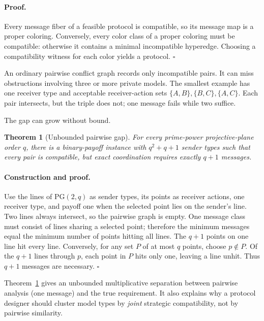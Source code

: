 \documentclass[letterpaper]{article} %
\newtheorem{theorem}{Theorem}
\begin{document}
\paragraph{Proof.}
Every message fiber of a feasible protocol is compatible, so its message map is
a proper coloring. Conversely, every color class of a proper coloring must be
compatible: otherwise it contains a minimal incompatible hyperedge. Choosing a
compatibility witness for each color yields a protocol. \hfill$\square$

An ordinary pairwise conflict graph records only incompatible pairs. It can
miss obstructions involving three or more private models. The smallest example
has one receiver type and acceptable receiver-action sets
$\{A,B\},\{B,C\},\{A,C\}$. Each pair intersects, but the triple does not; one
message fails while two suffice.

The gap can grow without bound.

\begin{theorem}[Unbounded pairwise gap]\label{thm:projective}
For every prime-power projective-plane order $q$, there is a binary-payoff
instance with $q^2+q+1$ sender types such that every pair is compatible, but
exact coordination requires exactly $q+1$ messages.
\end{theorem}

\paragraph{Construction and proof.}
Use the lines of $\mathrm{PG}(2,q)$ as sender types, its points as receiver
actions, one receiver type, and payoff one when the selected point lies on the
sender's line. Two lines always intersect, so the pairwise graph is empty.
One message class must consist of lines sharing a selected point; therefore the
minimum messages equal the minimum number of points hitting all lines. The
$q+1$ points on one line hit every line. Conversely, for any set $P$ of at most
$q$ points, choose $p\notin P$. Of the $q+1$ lines through $p$, each point in
$P$ hits only one, leaving a line unhit. Thus $q+1$ messages are necessary.
\hfill$\square$

Theorem~\ref{thm:projective} gives an unbounded multiplicative separation
between pairwise analysis (one message) and the true requirement. It also
explains why a protocol designer should cluster model types by \emph{joint}
strategic compatibility, not by pairwise similarity.
\end{document}
